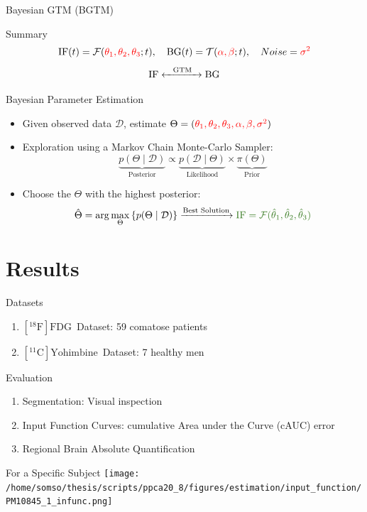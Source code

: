 \documentclass[aspectratio=169]{beamer}
\newcommand{\fdg}{$[^{18}\mathrm{F}]\text{FDG}$}
\newcommand{\yohimbine}{$[^{11}\mathrm{C}]\text{Yohimbine}$}
\begin{document}
\begin{frame}[t]{Bayesian GTM (BGTM)}
	\begin{block}{Summary}
		\[
			\text{IF}(t) = \mathcal{F}(\textcolor{red}{\theta_1,\theta_2,\theta_3};t),
			\quad \text{BG}(t)=\mathcal{T}(\textcolor{red}{\alpha,\beta};t),
			\quad Noise=\textcolor{red}{\sigma^2}
		\]
		\[
			\text{IF} \xleftrightarrow{\text{\quad GTM\quad}} \text{BG}
		\]
	\end{block}
	\pause
	\begin{block}{Bayesian Parameter Estimation}
		\small
		\begin{itemize}
			\item<2-> Given observed data $\mathcal{D}$, estimate $\Theta=(\textcolor{red}{\theta_1, \theta_2, \theta_3, \alpha, \beta,\sigma^2})$
			\item<3-> Exploration using a Markov Chain Monte-Carlo Sampler:
			      \[
				      \underbrace{p(\Theta \mid \mathcal{D})}_{\text{Posterior}} \propto \underbrace{p(\mathcal{D} \mid \Theta)}_{\text{Likelihood}} \times \underbrace{\pi(\Theta)}_{\text{Prior}}
			      \]
			\item<4-> Choose the $\Theta$ with the highest posterior:
			      \[
				      \hat{\Theta} = \arg\max_{\Theta} \left\{ p(\Theta \mid \mathcal{D}) \right\}
				      \xrightarrow{\text{Best Solution}}
				      \textcolor{OliveGreen}{\text{IF} = \mathcal{F}(\hat{\theta}_1, \hat{\theta}_2, \hat{\theta}_3)}
			      \]
		\end{itemize}
	\end{block}
\end{frame}



\section{Results}
\begin{frame}{Datasets}
	\begin{enumerate}
		\large
		\setlength\itemsep{10em}
		\item \fdg\ Dataset: 59 comatose patients
		\item \yohimbine\ Dataset: 7 healthy men
	\end{enumerate}
\end{frame}
\begin{frame}{Evaluation}
	\begin{enumerate}
		\itemsep 6em
		\large
		\item Segmentation: Visual inspection
		\item Input Function Curves: cumulative Area under the Curve (cAUC) error
		\item Regional Brain Absolute Quantification
	\end{enumerate}

\end{frame}
\begin{frame}[t]{For a Specific Subject}
	\texttt{[image: /home/somso/thesis/scripts/ppca20\_8/figures/estimation/input\_function/PM10845\_1\_infunc.png]}

\end{frame}
\end{document}
